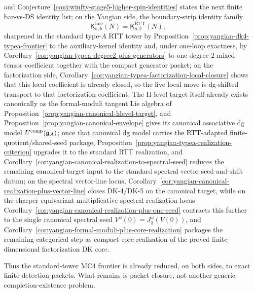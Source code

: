\begin{proposition}
\begin{enumerate}[label=\textup{(\alph*)}]
  and
  Conjecture~\ref{conj:winfty-stage5-higher-spin-identities} states the
  next finite bar-vs-DS identity list; on the
  Yangian side, the boundary-strip identity family
  \[
  \mathsf{K}^{\mathrm{line}}_{a,b}(N)
  =
  \mathsf{K}^{\mathrm{RTT}}_{a,b}(N),
  \]
  sharpened in the standard type-$A$ RTT tower by
  Proposition~\ref{prop:yangian-dk4-typea-frontier} to the
  auxiliary-kernel identity and, under one-loop exactness, by
  Corollary~\ref{cor:yangian-typea-degree2-plus-generators} to one
  degree-$2$ mixed-tensor coefficient together with the compact
  generator packet; on the factorization side,
  Corollary~\ref{cor:yangian-typea-factorization-local-closure}
  shows that this local coefficient is already closed, so the live
  local move is dg-shifted transport to that factorization coefficient.
  The H-level target itself already exists canonically as the
  formal-moduli tangent Lie algebra of
  Proposition~\ref{prop:yangian-canonical-hlevel-target}, and
  Proposition~\ref{prop:yangian-canonical-envelope} gives its canonical
  associative dg model
  \(U^{\mathrm{comp}}(\mathfrak{g}_{\mathcal{A}})\); once that canonical dg
  model carries the RTT-adapted finite-quotient/shared-seed package,
  Proposition~\ref{prop:yangian-typea-realization-criterion}
  upgrades it to the standard RTT realization, and
  Corollary~\ref{cor:yangian-canonical-realization-to-spectral-seed}
  reduces the remaining canonical-target input to the standard
  spectral vector seed-and-shift datum; on the spectral vector-line
  locus,
  Corollary~\ref{cor:yangian-canonical-realization-plus-vector-line}
  closes DK-4/DK-5 on the canonical target, while on the sharper
  equivariant multiplicative spectral realization locus
  Corollary~\ref{cor:yangian-canonical-realization-plus-one-seed}
  contracts this further to the single canonical spectral seed
  \(V^\omega(0)=J_q^\omega(V(0))\), and
  Corollary~\ref{cor:yangian-formal-moduli-plus-core-realization}
  packages the remaining categorical step as compact-core realization
  of the proved finite-dimensional factorization DK core.
\end{enumerate}
Thus the standard-tower MC4 frontier is already reduced, on both sides,
to exact finite-detection packets.  What remains is packet closure, not
another generic completion-existence problem.
\end{proposition}

